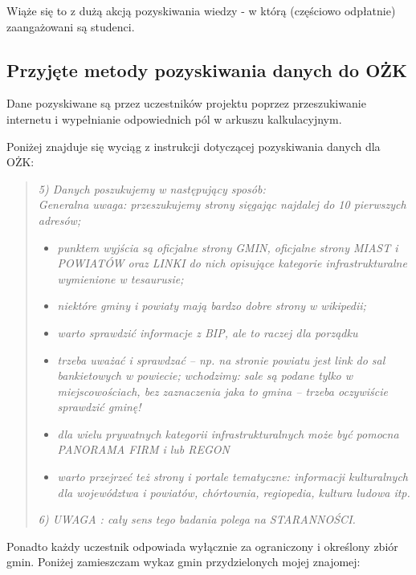 \documentclass[a4 122pt]{article}
\begin{document}
			Wiąże się to z dużą akcją pozyskiwania wiedzy - w którą (częściowo odpłatnie) zaangażowani są studenci.

		\subsection{Przyjęte metody pozyskiwania danych do OŻK}

			Dane pozyskiwane są przez uczestników projektu poprzez przeszukiwanie internetu i wypełnianie odpowiednich pól w arkuszu kalkulacyjnym.
			
			Poniżej znajduje się wyciąg z instrukcji dotyczącej pozyskiwania danych dla OŻK:
			
			
			\begin{quote}

				\textit{5) Danych poszukujemy w następujący sposób:\\
				Generalna uwaga: przeszukujemy strony sięgając najdalej do 10 pierwszych adresów;}
				
				
				\begin{itemize}
				
					\item \textit{punktem wyjścia są oficjalne strony GMIN, oficjalne strony MIAST i POWIATÓW oraz LINKI do nich opisujące kategorie infrastrukturalne wymienione w tesaurusie;}
					\item \textit{niektóre gminy i powiaty mają bardzo dobre strony w wikipedii;}
					\item \textit{warto sprawdzić informacje z BIP, ale to raczej dla porządku}
					\item \textit{trzeba uważać i sprawdzać – np. na stronie powiatu jest link do sal bankietowych w powiecie; wchodzimy: sale są podane tylko w miejscowościach, bez zaznaczenia jaka to gmina – trzeba oczywiście sprawdzić gminę!}
					\item \textit{dla wielu prywatnych kategorii infrastrukturalnych może być pomocna PANORAMA FIRM i lub REGON}
					\item \textit{warto przejrzeć też strony i portale tematyczne: informacji kulturalnych dla województwa i powiatów, chórtownia, regiopedia, kultura ludowa itp.}
				\end{itemize}
				
				\textit{6) UWAGA : cały sens tego badania polega na STARANNOŚCI.}
			\end{quote}
	
			Ponadto każdy uczestnik odpowiada wyłącznie za ograniczony i określony zbiór gmin.
			Poniżej zamieszczam wykaz gmin przydzielonych mojej znajomej:
			
\end{document}

